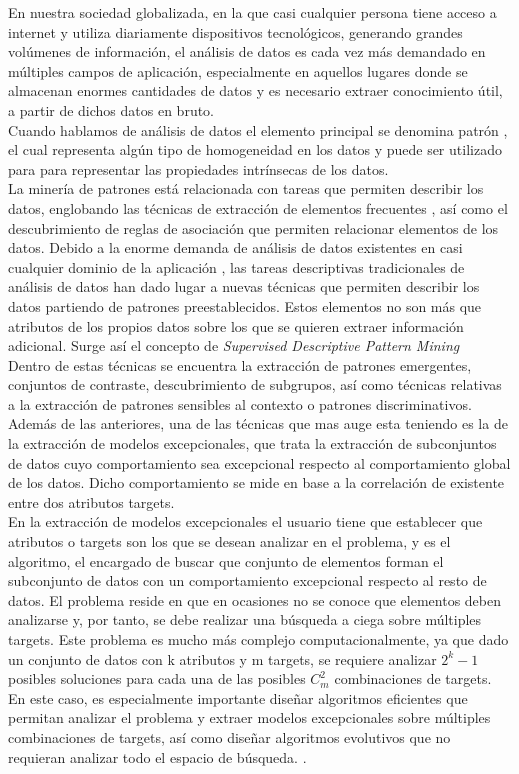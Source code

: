 \documentclass[a4paper,12pt,twoside,final]{book}
\begin{document}
En nuestra sociedad globalizada, en la que casi cualquier persona tiene acceso a internet y utiliza diariamente dispositivos tecnológicos, generando grandes volúmenes de información, el análisis de datos es cada vez más demandado en múltiples campos de aplicación, especialmente en aquellos lugares donde se almacenan enormes cantidades de datos y es necesario extraer conocimiento útil, a partir de dichos datos en bruto.\\

Cuando hablamos de análisis de datos el elemento principal se denomina patrón \cite{}, el cual representa algún tipo de homogeneidad en los datos y puede ser utilizado para para representar las propiedades intrínsecas de los datos.\\

La minería de patrones está relacionada con tareas que permiten describir los datos, englobando las técnicas de extracción de elementos frecuentes , así como el descubrimiento de reglas de asociación que permiten relacionar elementos de los datos. Debido a la enorme demanda de análisis de datos existentes en casi cualquier dominio de la aplicación , las tareas descriptivas tradicionales de análisis de datos han dado lugar a nuevas técnicas que permiten describir los datos partiendo de patrones preestablecidos. Estos elementos no son más que atributos de los propios datos sobre los que se quieren extraer información adicional. Surge así el concepto de \textit{Supervised Descriptive Pattern Mining} \cite{}\\

Dentro de estas técnicas se encuentra la extracción de patrones emergentes, conjuntos de contraste, descubrimiento de subgrupos, así como técnicas relativas a la extracción de patrones sensibles al contexto o patrones discriminativos. Además de las anteriores, una de las técnicas que mas auge esta teniendo es la de la extracción de modelos excepcionales, que trata la extracción de subconjuntos de datos cuyo comportamiento sea excepcional respecto al comportamiento global de los datos. Dicho comportamiento se mide en base a la correlación de existente entre dos atributos targets.\\

En la extracción de modelos excepcionales \cite{} el usuario tiene que establecer que atributos o targets son los que se desean analizar en el problema, y es el algoritmo, el encargado de buscar que conjunto de elementos forman el subconjunto de datos con un comportamiento excepcional respecto al resto de datos. El problema reside en que en ocasiones no se conoce que elementos deben analizarse y, por tanto, se debe realizar una búsqueda a ciega sobre múltiples targets. Este problema es mucho más complejo computacionalmente, ya que dado un conjunto de datos con k atributos y m targets, se requiere analizar $2^k-1$ posibles soluciones para cada una de las posibles $C_m^2$ combinaciones de targets. En este caso, es especialmente importante diseñar algoritmos eficientes que permitan analizar el problema y extraer modelos excepcionales sobre múltiples combinaciones de targets, así como diseñar algoritmos evolutivos que no requieran analizar todo el espacio de búsqueda. \cite{}.
\end{document}
